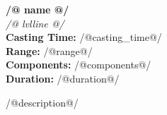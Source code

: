 
\small
\par
\noindent\textbf{\normalsize /@ name @/}\\
\textit{/@ lvlline @/}\\
\textbf{Casting Time:} /@casting_time@/\\
\textbf{Range:} /@range@/\\
\textbf{Components:} /@components@/\\
\textbf{Duration:} /@duration@/

/@description@/
